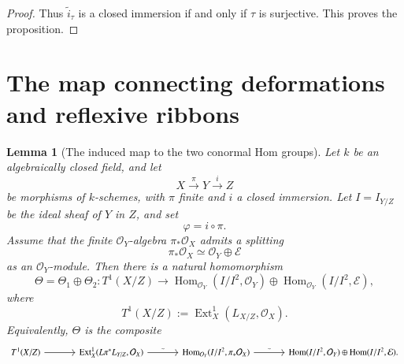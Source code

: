 \documentclass[11pt,twoside]{amsart}
\theoremstyle{plain}
\numberwithin{equation}{section}
\newtheorem{lemma}[theorem]{Lemma}
\theoremstyle{definition}
\begin{document}
\begin{proof}
Thus \(\widetilde i_\tau\) is a closed immersion if and only if \(\tau\) is surjective.
This proves the proposition.
\end{proof}


\section{The map connecting deformations and reflexive ribbons}

\begin{lemma}[The induced map to the two conormal Hom groups]
\label{lem:T1-map-to-conormal-Hom}
Let \(k\) be an algebraically closed field, and let
\[
    X \xrightarrow{\pi} Y \xrightarrow{i} Z
\]
be morphisms of \(k\)-schemes, with \(\pi\) finite and \(i\) a closed immersion.
Let \(I=I_{Y/Z}\) be the ideal sheaf of \(Y\) in \(Z\), and set
\[
    \varphi=i\circ \pi.
\]
Assume that the finite \(\mathcal O_Y\)-algebra \(\pi_*\mathcal O_X\) admits a splitting
\[
    \pi_*\mathcal O_X \simeq \mathcal O_Y\oplus \mathcal E
\]
as an \(\mathcal O_Y\)-module. Then there is a natural homomorphism
\[
    \Theta=\Theta_1\oplus \Theta_2:
    T^1(X/Z)
    \longrightarrow
    \operatorname{Hom}_{\mathcal O_Y}(I/I^2,\mathcal O_Y)
    \oplus
    \operatorname{Hom}_{\mathcal O_Y}(I/I^2,\mathcal E),
\]
where
\[
    T^1(X/Z):=\operatorname{Ext}^1_X(L_{X/Z},\mathcal O_X).
\]
Equivalently, \(\Theta\) is the composite
\[
\begin{tikzcd}[column sep=large]
    T^1(X/Z)
    \arrow[r]
    &
    \operatorname{Ext}^1_X(L\pi^*L_{Y/Z},\mathcal O_X)
    \arrow[r,"\sim"]
    &
    \operatorname{Hom}_{\mathcal O_Y}(I/I^2,\pi_*\mathcal O_X)
    \arrow[r,"\sim"]
    &
    \operatorname{Hom}(I/I^2,\mathcal O_Y)
    \oplus
    \operatorname{Hom}(I/I^2,\mathcal E).
\end{tikzcd}
\]
\end{lemma}
\end{document}
